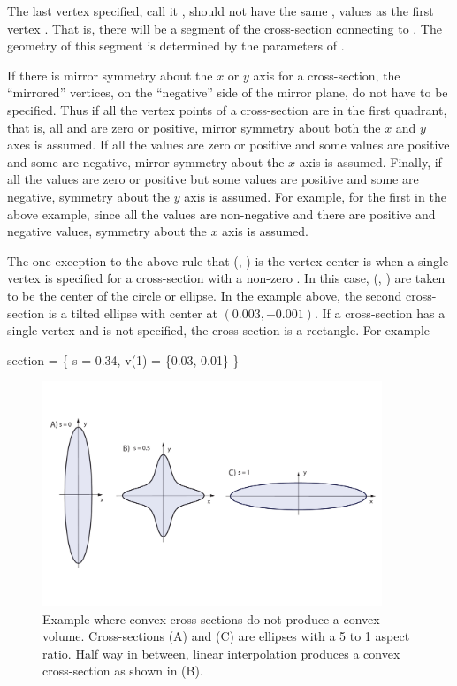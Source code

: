 The last vertex specified, call it , should not have the
same ,  values as the first vertex . That
is, there will be a segment of the cross-section connecting
 to . The geometry of this segment is determined
by the parameters of .

If there is mirror symmetry about the $x$ or $y$ axis for a
cross-section, the ``mirrored'' vertices, on the ``negative'' side of
the mirror plane, do not have to be specified. Thus if all the vertex
points of a cross-section are in the first quadrant, that is, all
 and  are zero or positive, mirror symmetry about both the
$x$ and $y$ axes is assumed. If all the  values are zero or
positive and some  values are positive and some are negative,
mirror symmetry about the $x$ axis is assumed. Finally, if all the
 values are zero or positive but some  values are
positive and some are negative, symmetry about the $y$ axis is
assumed. For example, for the first in the above example, since
all the  values are non-negative and there are positive and
negative  values, symmetry about the $x$ axis is assumed.

The one exception to the above rule that (, ) is the
vertex center is when a single vertex  is specified for a
cross-section with a non-zero . In this case,
(, ) are taken to be the center of the circle or
ellipse. In the example above, the second cross-section is a
tilted ellipse with center at $(0.003, -0.001)$. If a cross-section
has a single vertex and  is
not specified, the cross-section is a rectangle. For example
\begin{example}
    section = \{ s = 0.34, v(1) = \{0.03, 0.01\} \}
\end{example}

\begin{figure}[tb]
  \centering
  \includegraphics[width=4in]{concave-capillary.pdf}
  \caption[Convex cross-sections do not guarantee a convex volume.]
{Example where convex cross-sections do not produce a convex volume.
Cross-sections (A) and (C) are ellipses with a 5 to 1 aspect ratio.
Half way in between, linear interpolation produces a convex cross-section
as shown in (B).} 
  \label{f:concave.capillary}
\end{figure}

